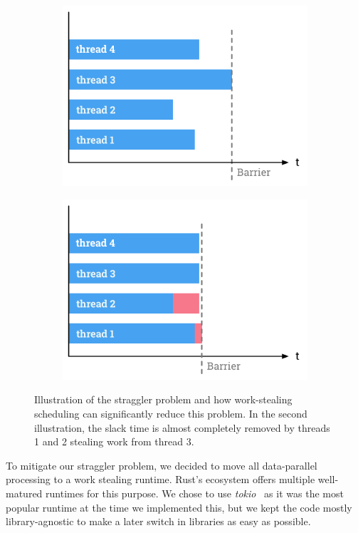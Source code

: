 \begin{figure}[h]
    \begin{subfigure}[t]{.45\textwidth}
        \centering
        \includegraphics[width=.85\textwidth,keepaspectratio]{gfx/preliminaries-labyrinth/preliminaries-straggler}
    \end{subfigure}%
    \hfill
    \begin{subfigure}[t]{.45\textwidth}
        \centering
        \includegraphics[width=.85\textwidth,keepaspectratio]{gfx/preliminaries-labyrinth/preliminaries-work-stealing}
    \end{subfigure}%
    \caption{Illustration of the straggler problem and how work-stealing scheduling can significantly reduce this problem. In the second illustration, the slack time is almost completely removed by threads 1 and 2 stealing work from thread 3.}%
    \label{fig:preliminary:straggler}
\end{figure}

To mitigate our straggler problem, we decided to move all data-parallel processing to a work stealing runtime.
Rust's ecosystem offers multiple well-matured runtimes for this purpose.
We chose to use \emph{tokio}~\cite{WEB:tokiors2020} as it was the most popular runtime at the time we implemented this, but we kept the code mostly library-agnostic to make a later switch in libraries as easy as possible.

